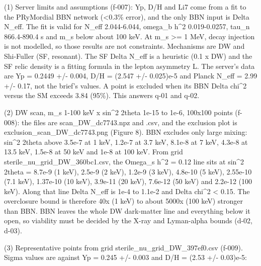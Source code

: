 \documentclass[11pt,a4paper]{article}
\begin{document}
(1) Server limits and assumptions (f-007): Yp, D/H and Li7 come from a fit to the PRyMordial BBN network (\textless{}0.3\% error), and the only BBN input is Delta N\_eff. The fit is valid for N\_eff 2.044-6.044, omega\_b h\textasciicircum{}2 0.019-0.0257, tau\_n 866.4-890.4 s and m\_s below about 100 keV. At m\_s \textgreater{}= 1 MeV, decay injection is not modelled, so those results are not constraints. Mechanisms are DW and Shi-Fuller (SF, resonant). The SF Delta N\_eff is a heuristic (0.1 x DW) and the SF relic density is a fitting formula in the lepton asymmetry L. The server's data are Yp = 0.2449 +/- 0.004, D/H = (2.547 +/- 0.025)e-5 and Planck N\_eff = 2.99 +/- 0.17, not the brief's values. A point is excluded when its BBN Delta chi\textasciicircum{}2 versus the SM exceeds 3.84 (95\%). This answers q-01 and q-02.

(2) DW scan, m\_s 1-100 keV x sin\textasciicircum{}2 2theta 1e-15 to 1e-6, 100x100 points (f-008): the files are scan\_DW\_dc7743.npz and .csv, and the exclusion plot is exclusion\_scan\_DW\_dc7743.png (Figure 8). BBN excludes only large mixing: sin\textasciicircum{}2 2theta above 3.5e-7 at 1 keV, 1.2e-7 at 3.7 keV, 8.1e-8 at 7 keV, 4.3e-8 at 13.5 keV, 1.5e-8 at 50 keV and 1e-8 at 100 keV. From grid sterile\_nu\_grid\_DW\_360bc1.csv, the Omega\_s h\textasciicircum{}2 = 0.12 line sits at sin\textasciicircum{}2 2theta = 8.7e-9 (1 keV), 2.5e-9 (2 keV), 1.2e-9 (3 keV), 4.8e-10 (5 keV), 2.55e-10 (7.1 keV), 1.37e-10 (10 keV), 3.9e-11 (20 keV), 7.6e-12 (50 keV) and 2.2e-12 (100 keV). Along that line Delta N\_eff is 1e-4 to 1.1e-2 and \textbar{}Delta chi\textasciicircum{}2\textbar{} \textless{} 0.15. The overclosure bound is therefore 40x (1 keV) to about 5000x (100 keV) stronger than BBN. BBN leaves the whole DW dark-matter line and everything below it open, so viability must be decided by the X-ray and Lyman-alpha bounds (d-02, d-03).

(3) Representative points from grid sterile\_nu\_grid\_DW\_397ef0.csv (f-009). Sigma values are against Yp = 0.245 +/- 0.003 and D/H = (2.53 +/- 0.03)e-5:
\end{document}
